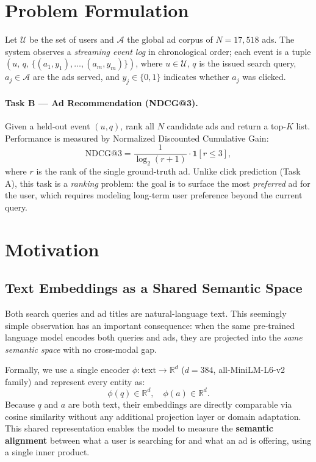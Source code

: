 \documentclass[10pt,twocolumn]{article}
\newcommand{\R}{\mathbb{R}}
\begin{document}
\section{Problem Formulation}
\label{sec:problem}

Let $\mathcal{U}$ be the set of users and $\mathcal{A}$ the global ad
corpus of $N = 17{,}518$ ads.
The system observes a \emph{streaming event log} in chronological order;
each event is a tuple
$(u,\, q,\, \{(a_1, y_1), \ldots, (a_m, y_m)\})$,
where $u \in \mathcal{U}$, $q$ is the issued search query,
$a_j \in \mathcal{A}$ are the ads served, and $y_j \in \{0, 1\}$
indicates whether $a_j$ was clicked.

\paragraph{Task B --- Ad Recommendation (NDCG@3).}
Given a held-out event $(u, q)$,
rank all $N$ candidate ads and return a top-$K$ list.
Performance is measured by Normalized Discounted Cumulative Gain:
\[
  \mathrm{NDCG@3} = \frac{1}{\log_2(r+1)} \cdot \mathbf{1}[r \leq 3],
\]
where $r$ is the rank of the single ground-truth ad.
Unlike click prediction (Task A), this task is a \emph{ranking} problem:
the goal is to surface the most \emph{preferred} ad for the user,
which requires modeling long-term user preference beyond the current query.

\section{Motivation}
\label{sec:motivation}

\subsection{Text Embeddings as a Shared Semantic Space}
\label{sec:motivation:emb}

Both search queries and ad titles are natural-language text.
This seemingly simple observation has an important consequence:
when the same pre-trained language model encodes both queries and ads,
they are projected into the \emph{same semantic space} with no
cross-modal gap.

Formally, we use a single encoder $\phi : \text{text} \to \R^d$
($d = 384$, all-MiniLM-L6-v2 family) and represent every entity as:
\[
  \phi(q) \in \R^d, \quad \phi(a) \in \R^d.
\]
Because $q$ and $a$ are both text, their embeddings are directly
comparable via cosine similarity without any additional projection layer
or domain adaptation.
This shared representation enables the model to measure the
\textbf{semantic alignment} between what a user is searching for and
what an ad is offering, using a single inner product.
\end{document}
